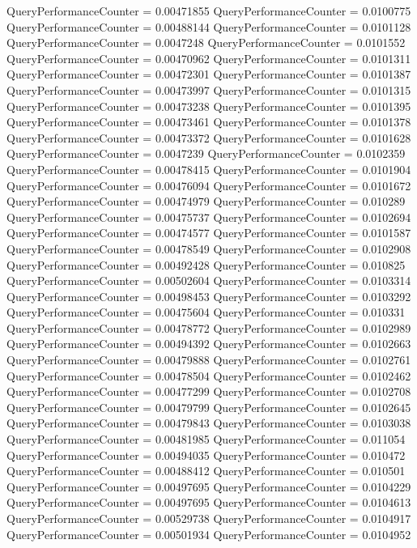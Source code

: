 \documentclass[9pt]{article}
\theoremstyle{plain}
\theoremstyle{definition}
\theoremstyle{remark}
\numberwithin{equation}{section}
\begin{document}
QueryPerformanceCounter  =  0.00471855
QueryPerformanceCounter  =  0.0100775
QueryPerformanceCounter  =  0.00488144
QueryPerformanceCounter  =  0.0101128
QueryPerformanceCounter  =  0.0047248
QueryPerformanceCounter  =  0.0101552
QueryPerformanceCounter  =  0.00470962
QueryPerformanceCounter  =  0.0101311
QueryPerformanceCounter  =  0.00472301
QueryPerformanceCounter  =  0.0101387
QueryPerformanceCounter  =  0.00473997
QueryPerformanceCounter  =  0.0101315
QueryPerformanceCounter  =  0.00473238
QueryPerformanceCounter  =  0.0101395
QueryPerformanceCounter  =  0.00473461
QueryPerformanceCounter  =  0.0101378
QueryPerformanceCounter  =  0.00473372
QueryPerformanceCounter  =  0.0101628
QueryPerformanceCounter  =  0.0047239
QueryPerformanceCounter  =  0.0102359
QueryPerformanceCounter  =  0.00478415
QueryPerformanceCounter  =  0.0101904
QueryPerformanceCounter  =  0.00476094
QueryPerformanceCounter  =  0.0101672
QueryPerformanceCounter  =  0.00474979
QueryPerformanceCounter  =  0.010289
QueryPerformanceCounter  =  0.00475737
QueryPerformanceCounter  =  0.0102694
QueryPerformanceCounter  =  0.00474577
QueryPerformanceCounter  =  0.0101587
QueryPerformanceCounter  =  0.00478549
QueryPerformanceCounter  =  0.0102908
QueryPerformanceCounter  =  0.00492428
QueryPerformanceCounter  =  0.010825
QueryPerformanceCounter  =  0.00502604
QueryPerformanceCounter  =  0.0103314
QueryPerformanceCounter  =  0.00498453
QueryPerformanceCounter  =  0.0103292
QueryPerformanceCounter  =  0.00475604
QueryPerformanceCounter  =  0.010331
QueryPerformanceCounter  =  0.00478772
QueryPerformanceCounter  =  0.0102989
QueryPerformanceCounter  =  0.00494392
QueryPerformanceCounter  =  0.0102663
QueryPerformanceCounter  =  0.00479888
QueryPerformanceCounter  =  0.0102761
QueryPerformanceCounter  =  0.00478504
QueryPerformanceCounter  =  0.0102462
QueryPerformanceCounter  =  0.00477299
QueryPerformanceCounter  =  0.0102708
QueryPerformanceCounter  =  0.00479799
QueryPerformanceCounter  =  0.0102645
QueryPerformanceCounter  =  0.00479843
QueryPerformanceCounter  =  0.0103038
QueryPerformanceCounter  =  0.00481985
QueryPerformanceCounter  =  0.011054
QueryPerformanceCounter  =  0.00494035
QueryPerformanceCounter  =  0.010472
QueryPerformanceCounter  =  0.00488412
QueryPerformanceCounter  =  0.010501
QueryPerformanceCounter  =  0.00497695
QueryPerformanceCounter  =  0.0104229
QueryPerformanceCounter  =  0.00497695
QueryPerformanceCounter  =  0.0104613
QueryPerformanceCounter  =  0.00529738
QueryPerformanceCounter  =  0.0104917
QueryPerformanceCounter  =  0.00501934
QueryPerformanceCounter  =  0.0104952
\end{document}
